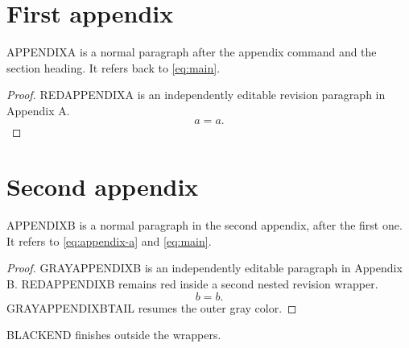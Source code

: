 \documentclass{article}
\newenvironment{OLD}{\color{previousR2}}{\ignorespacesafterend}
\newenvironment{REV}{\color{revisionR2}}{\ignorespacesafterend}
\numberwithin{equation}{section}
\begin{document}
\clearpage
\begin{appendix}
\section{First appendix}\label{sec:appendix-a}
APPENDIXA is a normal paragraph after the appendix command and the section heading.
It refers back to \eqref{eq:main}.

\begin{REV}
\begin{proof}
REDAPPENDIXA is an independently editable revision paragraph in Appendix A.
\begin{equation}\label{eq:appendix-a}
a=a.
\end{equation}
\end{proof}
\end{REV}

\clearpage
\section{Second appendix}\label{sec:appendix-b}
APPENDIXB is a normal paragraph in the second appendix, after the first one.
It refers to \eqref{eq:appendix-a} and \eqref{eq:main}.

\begin{OLD}
\begin{proof}
GRAYAPPENDIXB is an independently editable paragraph in Appendix B.
\begin{REV}
REDAPPENDIXB remains red inside a second nested revision wrapper.
\begin{equation}\label{eq:appendix-b}
b=b.
\end{equation}
\end{REV}
GRAYAPPENDIXBTAIL resumes the outer gray color.
\end{proof}
\end{OLD}

BLACKEND finishes outside the wrappers.
\end{appendix}
\end{document}
